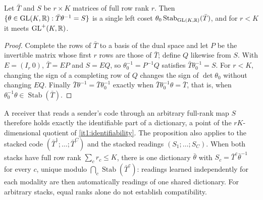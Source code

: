 \documentclass[11pt,letterpaper]{report}
\newcommand{\Stab}{\operatorname{Stab}}
\begin{document}
Let $\bar T$ and $S$ be $r\times K$ matrices of full row rank $r$. Then $\{\theta\in\mathrm{GL}(K,\mathbb R):\bar T\theta^{-1}=S\}$ is a single left coset $\theta_0\Stab_{\GL(K,\R)}(\bar T)$, and for $r<K$ it meets $\mathrm{GL}^+(K,\mathbb R)$.
\begin{proof}
Complete the rows of $\bar T$ to a basis of the dual space and let $P$ be the invertible matrix whose first $r$ rows are those of $\bar T$; define $Q$ likewise from $S$. With $E=(I_r\ 0)$, $\bar T=EP$ and $S=EQ$, so $\theta_0^{-1}=P^{-1}Q$ satisfies $\bar T\theta_0^{-1}=S$. For $r<K$, changing the sign of a completing row of $Q$ changes the sign of $\det\theta_0$ without changing $EQ$. Finally $\bar T\theta^{-1}=\bar T\theta_0^{-1}$ exactly when $\bar T\theta_0^{-1}\theta=\bar T$, that is, when $\theta_0^{-1}\theta\in\Stab(\bar T)$.
\end{proof}

A receiver that reads a sender's code through an arbitrary full-rank map $S$ therefore holds exactly the identifiable part of a dictionary, a point of the $rK$-dimensional quotient of \cref{it1:identifiability}. The proposition also applies to the stacked code $(\bar T^1;\ldots;\bar T^C)$ and the stacked readings $(S_1;\ldots;S_C)$. When both stacks have full row rank $\sum_cr_c\leq K$, there is one dictionary $\bar\theta$ with $S_c=\bar T^c\bar\theta^{-1}$ for every $c$, unique modulo $\bigcap_c\Stab(\bar T^c)$: readings learned independently for each modality are then automatically readings of one shared dictionary. For arbitrary stacks, equal ranks alone do not establish compatibility.
\end{document}

